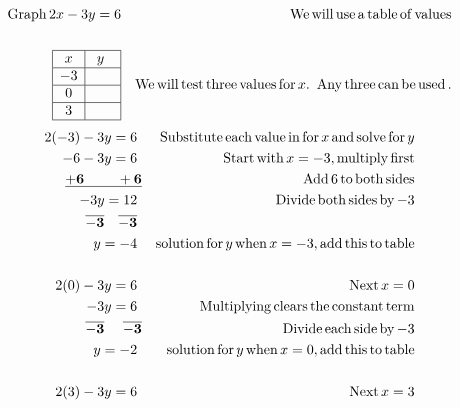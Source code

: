 \begin{example}\label{Lin45}
  
  \begin{eqnarray*}
    \operatorname{Graph} 2 x - 3 y = 6 &  & \operatorname{We} \operatorname{will} \operatorname{use} \operatorname{a}
    \operatorname{table} \operatorname{of} \operatorname{values}\\
    &  & \\
    \begin{array}{|c|c|}
      \hline
      x & ~y~~\\
      \hline
      - 3 & \\
      \hline
      0 & \\
      \hline
      3 & \\
      \hline
    \end{array} &  & \operatorname{We} \operatorname{will} \operatorname{test} \operatorname{three}
    \operatorname{values} \operatorname{for} x. \operatorname{~Any} \operatorname{three} \operatorname{can} \operatorname{be}
    \operatorname{used}.\\
      \end{eqnarray*}
      \begin{eqnarray*}
		2 (- 3) - 3 y = 6~ &  & \tmop{Substitute} \tmop{each} \tmop{value}
    \tmop{in} \tmop{for} x \tmop{and} \tmop{solve} \tmop{for} y\\
    - 6 - 3 y = 6~ &  & \tmop{Start} \tmop{with} x = - 3, \tmop{multiply}
    \tmop{first}\\
    \bf{\underline{+ 6 ~~~~~~~+ 6}} &  & \tmop{Add} 6 \tmop{to} \tmop{both} \tmop{sides}\\
    - 3 y = 12~ &  & \tmop{Divide} \tmop{both} \tmop{sides} \tmop{by} - 3\\
    \bf{\overline{- 3} ~~~ \overline{- 3}}~ &  & \\
    y = - 4~ &  & \tmop{solution} \tmop{for} y \tmop{when} x = - 3, \tmop{add}
    \tmop{this} \tmop{to} \tmop{table}\\
    &  & \\
    2 (0) - 3 y = 6~ &  & \tmop{Next} x = 0\\
    - 3 y = 6~ &  & \tmop{Multiplying} \tmop{clears} \tmop{the} \tmop{constant}
    \tmop{term}\\
    \bf{\overline{- 3} ~~~~ \overline{- 3}} &  & \tmop{Divide} \tmop{each} \tmop{side}
    \tmop{by} - 3\\
    y = - 2~ &  & \tmop{solution} \tmop{for} y \tmop{when} x = 0, \tmop{add}
    \tmop{this} \tmop{to} \tmop{table}\\
    &  & \\
    2 (3) - 3 y = 6~ &  & \tmop{Next} x = 3\\

\end{eqnarray*}
\end{example}
